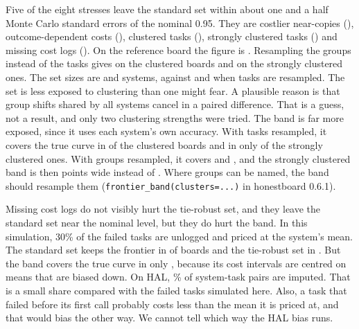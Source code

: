 \documentclass[11pt]{article}
\begin{document}
Five of the eight stresses leave the standard set within about one and a half Monte Carlo standard errors of the nominal 0.95. They are costlier near-copies (\NumValScNearCopiesJoint{}), outcome-dependent costs (\NumValScCostOutcomeDependenceJoint{}), clustered tasks (\NumValScClusteredTasksJoint{}), strongly clustered tasks (\NumValScStronglyClusteredTasksJoint{}) and missing cost logs (\NumValScMissingCostLogsJoint{}). On the reference board the figure is \NumValBaseKTwentyTOneFiftyJoint{}. Resampling the groups instead of the tasks gives \NumValScClusteredTasksClusterJoint{} on the clustered boards and \NumValScStronglyClusteredTasksClusterJoint{} on the strongly clustered ones. The set sizes are \NumValScClusteredTasksClusterSize{} and \NumValScStronglyClusteredTasksClusterSize{} systems, against \NumValScClusteredTasksSize{} and \NumValScStronglyClusteredTasksSize{} when tasks are resampled. The set is less exposed to clustering than one might fear. A plausible reason is that group shifts shared by all systems cancel in a paired difference. That is a guess, not a result, and only two clustering strengths were tried. The band is far more exposed, since it uses each system's own accuracy. With tasks resampled, it covers the true curve in \NumValScClusteredTasksBand{} of the clustered boards and in only \NumValScStronglyClusteredTasksBand{} of the strongly clustered ones. With groups resampled, it covers \NumValScClusteredTasksBandCluster{} and \NumValScStronglyClusteredTasksBandCluster{}, and the strongly clustered band is then \NumValScStronglyClusteredTasksBandWidthCluster{} points wide instead of \NumValScStronglyClusteredTasksBandWidth{}. Where groups can be named, the band should resample them (\texttt{frontier\_band(clusters=...)} in honestboard 0.6.1).

Missing cost logs do not visibly hurt the tie-robust set, and they leave the standard set near the nominal level, but they do hurt the band. In this simulation, 30\% of the failed tasks are unlogged and priced at the system's mean. The standard set keeps the frontier in \NumValScMissingCostLogsJoint{} of boards and the tie-robust set in \NumValScMissingCostLogsRobJoint{}. But the band covers the true curve in only \NumValScMissingCostLogsBand{}, because its cost intervals are centred on means that are biased down. On HAL, \NumHalUncostedTasksPct\% of system-task pairs are imputed. That is a small share compared with the failed tasks simulated here. Also, a task that failed before its first call probably costs less than the mean it is priced at, and that would bias the other way. We cannot tell which way the HAL bias runs.
\end{document}
